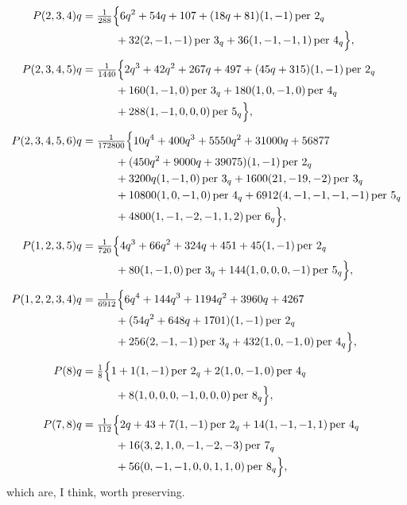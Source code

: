 \documentclass[11pt]{article}
\begin{document}
\begin{align*}
P(2, 3, 4)q &= \tfrac{1}{288}\Bigl\{6 q^2 + 54 q + 107 + (18 q + 81)(1, -1)\,\text{per }2_q \\
&\qquad\quad + 32 (2, -1, -1)\,\text{per }3_q + 36 (1, -1, -1, 1)\,\text{per }4_q\Bigr\}, \\[1ex]
P(2, 3, 4, 5)q &= \tfrac{1}{1440}\Bigl\{2 q^3 + 42 q^2 + 267 q + 497 + (45 q + 315)(1, -1)\,\text{per }2_q \\
&\qquad\quad + 160 (1, -1, 0)\,\text{per }3_q + 180 (1, 0, -1, 0)\,\text{per }4_q \\
&\qquad\quad + 288 (1, -1, 0, 0, 0)\,\text{per }5_q\Bigr\}, \\[1ex]
P(2, 3, 4, 5, 6)q &= \tfrac{1}{172800}\Bigl\{10 q^4 + 400 q^3 + 5550 q^2 + 31000 q + 56877 \\
&\qquad\quad + (450 q^2 + 9000 q + 39075)(1, -1)\,\text{per }2_q \\
&\qquad\quad + 3200 q (1, -1, 0)\,\text{per }3_q + 1600 (21, -19, -2)\,\text{per }3_q \\
&\qquad\quad + 10800 (1, 0, -1, 0)\,\text{per }4_q + 6912 (4, -1, -1, -1, -1)\,\text{per }5_q \\
&\qquad\quad + 4800 (1, -1, -2, -1, 1, 2)\,\text{per }6_q\Bigr\}, \\[1ex]
P(1, 2, 3, 5)q &= \tfrac{1}{720}\Bigl\{4 q^3 + 66 q^2 + 324 q + 451 + 45 (1, -1)\,\text{per }2_q \\
&\qquad\quad + 80 (1, -1, 0)\,\text{per }3_q + 144 (1, 0, 0, 0, -1)\,\text{per }5_q\Bigr\}, \\[1ex]
P(1, 2, 2, 3, 4)q &= \tfrac{1}{6912}\Bigl\{6 q^4 + 144 q^3 + 1194 q^2 + 3960 q + 4267 \\
&\qquad\quad + (54 q^2 + 648 q + 1701)(1, -1)\,\text{per }2_q \\
&\qquad\quad + 256 (2, -1, -1)\,\text{per }3_q + 432 (1, 0, -1, 0)\,\text{per }4_q\Bigr\}, \\[1ex]
P(8)q &= \tfrac{1}{8}\Bigl\{1 + 1 (1, -1)\,\text{per }2_q + 2 (1, 0, -1, 0)\,\text{per }4_q \\
&\qquad\quad + 8 (1, 0, 0, 0, -1, 0, 0, 0)\,\text{per }8_q\Bigr\}, \\[1ex]
P(7, 8)q &= \tfrac{1}{112}\Bigl\{2 q + 43 + 7 (1, -1)\,\text{per }2_q + 14 (1, -1, -1, 1)\,\text{per }4_q \\
&\qquad\quad + 16 (3, 2, 1, 0, -1, -2, -3)\,\text{per }7_q \\
&\qquad\quad + 56 (0, -1, -1, 0, 0, 1, 1, 0)\,\text{per }8_q\Bigr\},
\end{align*}
which are, I think, worth preserving.
\end{document}
